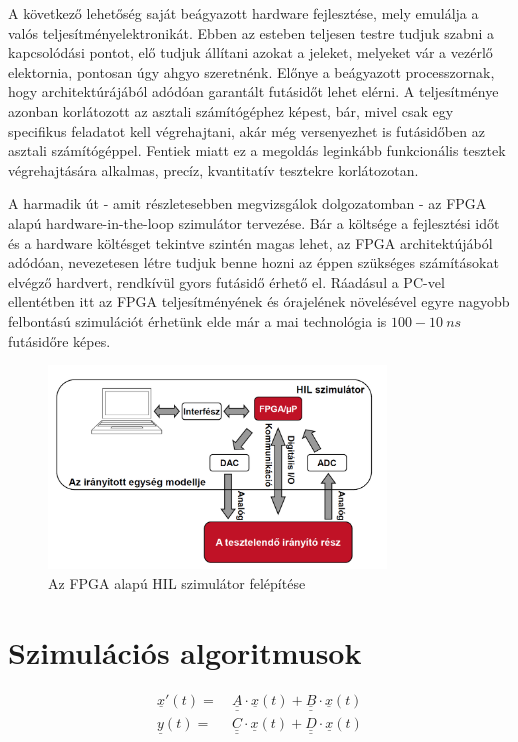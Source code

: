 A következő lehetőség saját beágyazott hardware fejlesztése, mely emulálja a valós teljesítményelektronikát. Ebben az esteben teljesen testre tudjuk szabni a kapcsolódási pontot, elő tudjuk állítani azokat a jeleket, melyeket vár a vezérlő elektornia, pontosan úgy ahgyo szeretnénk. Előnye a beágyazott processzornak, hogy architektúrájából adódóan garantált futásidőt lehet elérni. A teljesítménye azonban korlátozott az asztali számítógéphez képest, bár, mivel csak egy specifikus feladatot kell végrehajtani, akár még versenyezhet is futásidőben az asztali számítógéppel. Fentiek miatt ez a megoldás leginkább funkcionális tesztek végrehajtására alkalmas, precíz, kvantitatív tesztekre korlátozotan.

A harmadik út - amit részletesebben megvizsgálok dolgozatomban - az FPGA alapú hardware-in-the-loop szimulátor tervezése. Bár a költsége a fejlesztési időt és a hardware költésget tekintve szintén magas lehet, az FPGA architektújából adódóan, nevezetesen létre tudjuk benne hozni az éppen szükséges számításokat elvégző hardvert, rendkívül gyors futásidő érhető el. Ráadásul a PC-vel ellentétben itt az FPGA teljesítményének és órajelének növelésével egyre nagyobb felbontású szimulációt érhetünk elde már a mai technológia is $100 - 10 \ ns$ futásidőre képes.

\begin{figure}[h]
	\centering
	\includegraphics[width = 0.8\textwidth]{figures/hil_idea.png}
	\caption{Az FPGA alapú HIL szimulátor felépítése} 
	\label{fig:hil_idea}
\end{figure}


\section{Szimulációs algoritmusok}

\begin{equation}
\begin{align*}
\underline{x}'(t) =& \ \underline{\underline{A}}\cdot \underline{x}(t) + \underline{\underline{B}}\cdot{}\underline{x}(t) \\[0.3em]
\underline{y}(t) =& \ \underline{\underline{C}}\cdot \underline{x}(t) + \underline{\underline{D}}\cdot{}\underline{x}(t)
\end{align*} 
\end{equation}

